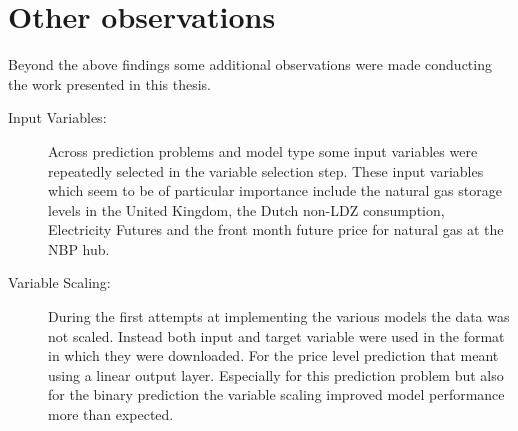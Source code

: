 \section{Other observations}
Beyond the above findings some additional observations were made conducting the work presented in this thesis.
\begin{description}
\item[Input Variables:] Across prediction problems and model type some input variables were repeatedly selected in the variable selection step. These input variables which seem to be of particular importance include the natural gas storage levels in the United Kingdom, the Dutch non-LDZ consumption, Electricity Futures and the front month future price for natural gas at the NBP hub.
\item[Variable Scaling:] During the first attempts at implementing the various models the data was not scaled. Instead both input and target variable were used in the format in which they were downloaded. For the price level prediction that meant using a linear output layer. Especially for this prediction problem but also for the binary prediction the variable scaling improved model performance more than expected.
\end{description}
